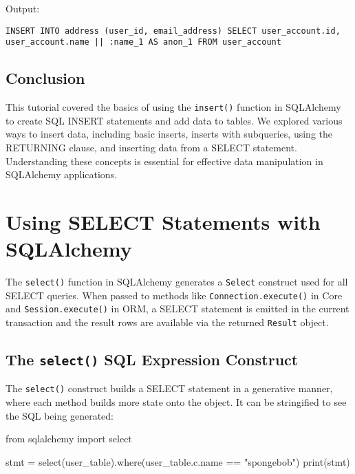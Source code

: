 \documentclass[
  letterpaper,
  DIV=11,
  numbers=noendperiod]{scrreprt}
\newenvironment{Shaded}{\begin{snugshade}}{\end{snugshade}}
\newcommand{\BuiltInTok}[1]{\textcolor[rgb]{0.00,0.23,0.31}{#1}}
\newcommand{\ImportTok}[1]{\textcolor[rgb]{0.00,0.46,0.62}{#1}}
\newcommand{\NormalTok}[1]{\textcolor[rgb]{0.00,0.23,0.31}{#1}}
\newcommand{\OperatorTok}[1]{\textcolor[rgb]{0.37,0.37,0.37}{#1}}
\newcommand{\StringTok}[1]{\textcolor[rgb]{0.13,0.47,0.30}{#1}}
\begin{document}
Output:

\begin{verbatim}
INSERT INTO address (user_id, email_address) SELECT user_account.id, user_account.name || :name_1 AS anon_1 FROM user_account
\end{verbatim}

\subsection{Conclusion}\label{conclusion-20}

This tutorial covered the basics of using the \texttt{insert()} function
in SQLAlchemy to create SQL INSERT statements and add data to tables. We
explored various ways to insert data, including basic inserts, inserts
with subqueries, using the RETURNING clause, and inserting data from a
SELECT statement. Understanding these concepts is essential for
effective data manipulation in SQLAlchemy applications.

\section{Using SELECT Statements with
SQLAlchemy}\label{using-select-statements-with-sqlalchemy}

The \texttt{select()} function in SQLAlchemy generates a \texttt{Select}
construct used for all SELECT queries. When passed to methods like
\texttt{Connection.execute()} in Core and \texttt{Session.execute()} in
ORM, a SELECT statement is emitted in the current transaction and the
result rows are available via the returned \texttt{Result} object.

\subsection{\texorpdfstring{The \texttt{select()} SQL Expression
Construct}{The select() SQL Expression Construct}}\label{the-select-sql-expression-construct}

The \texttt{select()} construct builds a SELECT statement in a
generative manner, where each method builds more state onto the object.
It can be stringified to see the SQL being generated:

\begin{Shaded}
\begin{Highlighting}[]
\ImportTok{from}\NormalTok{ sqlalchemy }\ImportTok{import}\NormalTok{ select}

\NormalTok{stmt }\OperatorTok{=}\NormalTok{ select(user\_table).where(user\_table.c.name }\OperatorTok{==} \StringTok{"spongebob"}\NormalTok{)}
\BuiltInTok{print}\NormalTok{(stmt)}
\end{Highlighting}
\end{Shaded}
\end{document}
